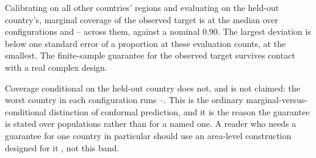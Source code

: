 Calibrating on all other countries' regions and evaluating on the held-out
country's, marginal coverage of the observed target is \AcovMed{} at the median
over \AcovN{} configurations and \AcovLo--\AcovHi{} across them, against a
nominal $0.90$. The largest deviation is below one standard error of a
proportion at these evaluation counts, \AcovSE{} at the smallest. The
finite-sample guarantee for the observed target survives contact with a real
complex design.

Coverage conditional on the held-out country does not, and is not claimed: the
worst country in each configuration runs \AcovWorstLo--\AcovWorstHi. This is the
ordinary marginal-versus-conditional distinction of conformal prediction, and it
is the reason the guarantee is stated over populations rather than for a named
one. A reader who needs a guarantee for one country in particular should use an
area-level construction designed for it \citep{burris2020exact,bersson2024optimal},
not this band.
